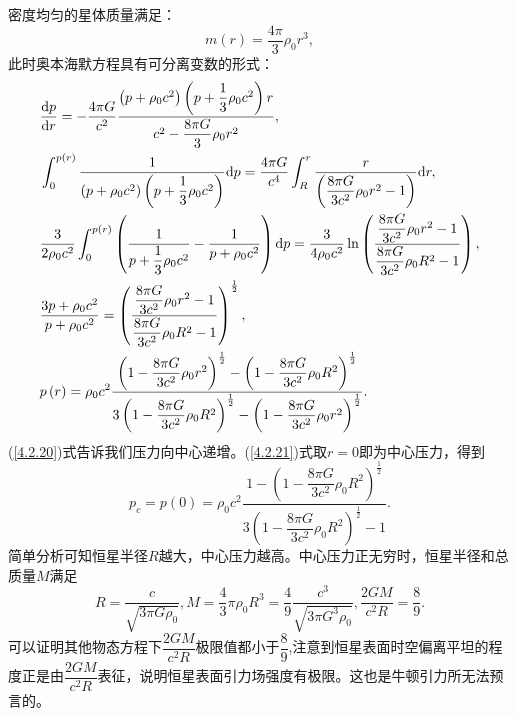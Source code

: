 \documentclass[11pt, a4paper, oneside, onecolumn]{ctexart}
\numberwithin{equation}{subsection}
\begin{document}
密度均匀的星体质量满足：
\begin{equation}
m\left(r\right)=\frac{4\pi}{3}\rho_{0}r^{3},\label{4.2.19}
\end{equation}
此时奥本海默方程具有可分离变数的形式：
\begin{align}
&\frac{\mathrm{d}p}{\mathrm{d}r}=-\frac{4\pi G}{c^{2}}\frac{\left(p+\rho_{0}c^{2}\right)\left(p+\dfrac{1}{3}\rho_{0}c^{2}\right)r}{c^{2}-\dfrac{8\pi G}{3}\rho_{0}r^{2}},\label{4.2.20}\\
&\int_{0}^{p\left(r\right)}\frac{1}{\left(p+\rho_{0}c^{2}\right)\left(p+\dfrac{1}{3}\rho_{0}c^{2}\right)}\mathrm{d}p=\frac{4\pi G}{c^{4}}\int_{R}^{r}\frac{r}{\left(\dfrac{8\pi G}{3c^{2}}\rho_{0}r^{2}-1\right)}\mathrm{d}r,\notag\\
&\frac{3}{2\rho_{0}c^{2}}\int_{0}^{p\left(r\right)}\left(\frac{1}{p+\dfrac{1}{3}\rho_{0}c^{2}}-\frac{1}{p+\rho_{0}c^{2}}\right)\mathrm{d}p=\frac{3}{4\rho_{0}c^{2}}\ln\left(\frac{\dfrac{8\pi G}{3c^{2}}\rho_{0}r^{2}-1}{\dfrac{8\pi G}{3c^{2}}\rho_{0}R^{2}-1}\right),\notag\\
&\frac{3p+\rho_{0}c^{2}}{p+\rho_{0}c^{2}}=\left(\frac{\dfrac{8\pi G}{3c^{2}}\rho_{0}r^{2}-1}{\dfrac{8\pi G}{3c^{2}}\rho_{0}R^{2}-1}\right)^{\frac{1}{2}},\notag\\
&p\left(r\right)=\rho_{0}c^{2}\frac{\left(1-\dfrac{8\pi G}{3c^{2}}\rho_{0}r^{2}\right)^{\frac{1}{2}}-\left(1-\dfrac{8\pi G}{3c^{2}}\rho_{0}R^{2}\right)^{\frac12}}{3\left(1-\dfrac{8\pi G}{3c^{2}}\rho_{0}R^{2}\right)^{\frac12}-\left(1-\dfrac{8\pi G}{3c^{2}}\rho_{0}r^{2}\right)^{\frac{1}{2}}}.\label{4.2.21}
\end{align}
(\ref{4.2.20})式告诉我们压力向中心递增。(\ref{4.2.21})式取$r=0$即为中心压力，得到
\begin{equation}
p_{c}=p\left(0\right)=\rho_{0}c^{2}\frac{1-\left(1-\dfrac{8\pi G}{3c^{2}}\rho_{0}R^{2}\right)^{\frac12}}{3\left(1-\dfrac{8\pi G}{3c^{2}}\rho_{0}R^{2}\right)^{\frac12}-1}.
\end{equation}
简单分析可知恒星半径$R$越大，中心压力越高。中心压力正无穷时，恒星半径和总质量$M$满足
\begin{equation}
R=\frac{c}{\sqrt{3\pi G\rho_{0}}},M=\frac{4}{3}\pi \rho_{0}R^{3}=\frac{4}{9}\frac{c^{3}}{\sqrt{3\pi G^{3}\rho_{0}}},\frac{2GM}{c^{2}R}=\frac{8}{9}.
\end{equation}
可以证明其他物态方程下$\dfrac{2GM}{c^{2}R}$极限值都小于$\dfrac{8}{9}$,注意到恒星表面时空偏离平坦的程度正是由$\dfrac{2GM}{c^{2}R}$表征，说明恒星表面引力场强度有极限。这也是牛顿引力所无法预言的。
\end{document}
